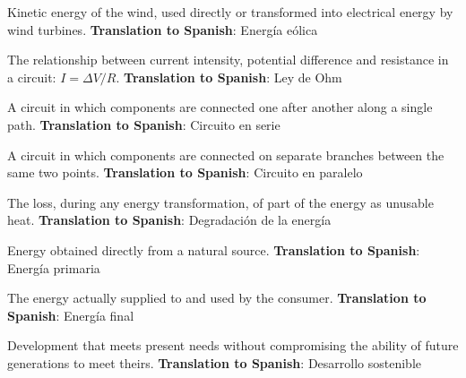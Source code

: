 \begin{vocabulary}
    Kinetic energy of the wind, used directly or transformed into electrical energy by wind turbines. \newline
    \textbf{Translation to Spanish}: Energía eólica
\end{vocabulary}

\begin{vocabulary}
    The relationship between current intensity, potential difference and resistance in a circuit: \(I = \Delta V / R\). \newline
    \textbf{Translation to Spanish}: Ley de Ohm
\end{vocabulary}

\begin{vocabulary}
    A circuit in which components are connected one after another along a single path. \newline
    \textbf{Translation to Spanish}: Circuito en serie
\end{vocabulary}

\begin{vocabulary}
    A circuit in which components are connected on separate branches between the same two points. \newline
    \textbf{Translation to Spanish}: Circuito en paralelo
\end{vocabulary}

\begin{vocabulary}
    The loss, during any energy transformation, of part of the energy as unusable heat. \newline
    \textbf{Translation to Spanish}: Degradación de la energía
\end{vocabulary}

\begin{vocabulary}
    Energy obtained directly from a natural source. \newline
    \textbf{Translation to Spanish}: Energía primaria
\end{vocabulary}

\begin{vocabulary}
    The energy actually supplied to and used by the consumer. \newline
    \textbf{Translation to Spanish}: Energía final
\end{vocabulary}

\begin{vocabulary}
    Development that meets present needs without compromising the ability of future generations to meet theirs. \newline
    \textbf{Translation to Spanish}: Desarrollo sostenible
\end{vocabulary}
